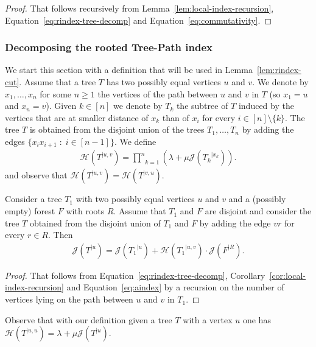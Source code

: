 \documentclass[11 pt]{modarticle}
\newcommand{\rtree}[2]{{#1}^{\lvert #2}}
\newcommand{\rindexsymbol}{\mathcal{J}}
\newcommand{\rindex}[2]{\rindexsymbol(\rtree{#2}{#1})}
\newcommand{\aindexsymbol}{\mathcal{H}}
\newcommand{\aindex}[3]{\aindexsymbol(\rtree{#3}{#1, #2})}
\begin{document}
\begin{proof}
That follows recursively from Lemma~\ref{lem:local-index-recursion}, Equation~\eqref{eq:rindex-tree-decomp} and Equation~\eqref{eq:commutativity}.
\end{proof}

\subsubsection{Decomposing the rooted Tree-Path index}

We start this section with a definition that will be used in Lemma~\ref{lem:rindex-cut}. Assume that a tree $T$ has two possibly equal vertices $u$ and $v$. We denote by $x_1, \dots, x_n$ for some $n \geq 1$ the vertices of the path between $u$ and $v$ in $T$ (so $x_1 = u$ and $x_n = v$). Given $k \in [n]$ we denote by $T_k$ the subtree of $T$ induced by the vertices that are at smaller distance of $x_k$ than of $x_i$ for every $i \in [n] \setminus \{k\}$. The tree $T$ is obtained from the disjoint union of the trees $T_1, \dots, T_n$ by adding the edges $\{x_i x_{i+1} \;:\; i \in [n-1]\}$. We define
\begin{eqnarray}
	\aindex{u}{v}{T} = \underset{k=1}{\overset{n}{\prod}} (\lambda + \mu \rindex{x_k}{T_k}). \label{eq:aindex}
\end{eqnarray}
and observe that $\aindex{u}{v}{T} = \aindex{v}{u}{T}$.

\begin{lem}\label{lem:rindex-cut}
	Consider a tree $T_1$ with two possibly equal vertices $u$ and $v$ and a (possibly empty) forest $F$ with roots $R$. Assume that $T_1$ and $F$ are disjoint and consider the tree $T$ obtained from the disjoint union of $T_1$ and $F$ by adding the edge $vr$ for every $r \in R$. Then
\begin{eqnarray*}
	\rindex{u}{T} = \rindex{u}{T_1} + \aindex{u}{v}{T_1} \cdot \rindex{R}{F}.
\end{eqnarray*}
\end{lem}

\begin{proof}
That follows from Equation~\eqref{eq:rindex-tree-decomp}, Corollary~\ref{cor:local-index-recursion} and Equation~\eqref{eq:aindex} by a recursion on the number of vertices lying on the path between $u$ and $v$ in $T_1$.
\end{proof}

Observe that with our definition given a tree $T$ with a vertex $u$ one has $\aindex{u}{u}{T} = \lambda + \mu \rindex{u}{T}$.
\end{document}
